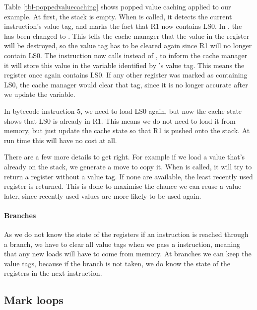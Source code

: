 Table \ref{tbl-poppedvaluecaching} shows popped value caching applied to our example. At first, the stack is empty. When  is called, it detects the current instruction's value tag, and marks the fact that R1 now contains LS0. In , the  has been changed to . This tells the cache manager that the value in the register will be destroyed, so the value tag has to be cleared again since R1 will no longer contain LS0. The  instruction now calls  instead of  , to inform the cache manager it will store this value in the variable identified by 's value tag. This means the register once again contains LS0. If any other register was marked as containing LS0, the cache manager would clear that tag, since it is no longer accurate after we update the variable.

In bytecode instruction 5, we need to load LS0 again, but now the cache state shows that LS0 is already in R1. This means we do not need to load it from memory, but just update the cache state so that R1 is pushed onto the stack. At run time this  will have no cost at all.

There are a few more details to get right. For example if we load a value that's already on the stack, we generate a move to copy it. When  is called, it will try to return a register without a value tag. If none are available, the least recently used register is returned. This is done to maximise the chance we can reuse a value later, since recently used values are more likely to be used again.

\paragraph{Branches} As we do not know the state of the registers if an instruction is reached through a branch, we have to clear all value tags when we pass a  instruction, meaning that any new loads will have to come from memory. At branches we can keep the value tags, because if the branch is not taken, we do know the state of the registers in the next instruction.

\subsection{Mark loops}
\label{sec-optimisation-markloops}


